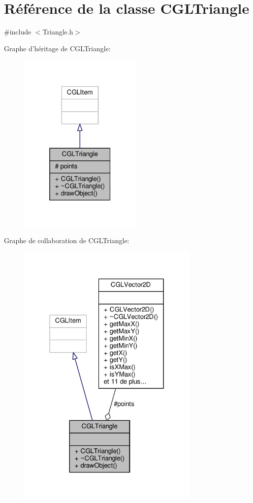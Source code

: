 \hypertarget{class_c_g_l_triangle}{\section{Référence de la classe C\-G\-L\-Triangle}
\label{class_c_g_l_triangle}
}


{\ttfamily \#include $<$Triangle.\-h$>$}



Graphe d'héritage de C\-G\-L\-Triangle\-:
\nopagebreak
\begin{figure}[H]
\begin{center}
\leavevmode
\includegraphics[width=172pt]{dd/d84/class_c_g_l_triangle__inherit__graph}
\end{center}
\end{figure}


Graphe de collaboration de C\-G\-L\-Triangle\-:
\nopagebreak
\begin{figure}[H]
\begin{center}
\leavevmode
\includegraphics[width=253pt]{d5/d01/class_c_g_l_triangle__coll__graph}
\end{center}
\end{figure}
